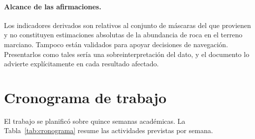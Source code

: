\paragraph{Alcance de las afirmaciones.} Los indicadores derivados son relativos al
conjunto de máscaras del que provienen y no constituyen estimaciones absolutas de la
abundancia de roca en el terreno marciano. Tampoco están validados para apoyar decisiones de
navegación. Presentarlos como tales sería una sobreinterpretación del dato, y el documento lo
advierte explícitamente en cada resultado afectado.

\section{Cronograma de trabajo}
\label{sec:cronograma}

El trabajo se planificó sobre quince semanas académicas. La
Tabla~\ref{tab:cronograma} resume las actividades previstas por semana.

